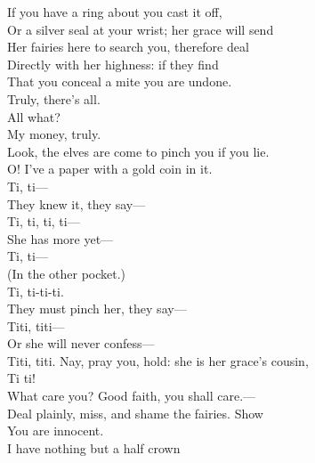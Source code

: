 \documentclass[a4paper,oneside,12pt]{memoir}
\begin{document}
\begin{drama*}
If you have a ring about you cast it off,\\
Or a silver seal at your wrist; her grace will send\\
Her fairies here to search you, therefore deal\\
Directly with her highness: if they find\\
That you conceal a mite you are undone.\\
\dapperspeaks Truly, there's all.\\
\facespeaks {} All what?\\
\dapperspeaks {} My money, truly.\\
\facespeaks Look, the elves are come to pinch you if you lie.\\
\dapperspeaks O! I've a paper with a gold coin in it.\\
\dolspeaks Ti, ti---\\
\facespeaks {} They knew it, they say---\\
\dolspeaks {} Ti, ti, ti, ti---\\
\subtlespeaks {} She has more yet---\\
\dolspeaks Ti, ti---\\
\facespeaks {} (In the other pocket.)\\
\dolspeaks {} Ti, ti-ti-ti.\\
\subtlespeaks They must pinch her, they say---\\
\dolspeaks {} Titi, titi---\\
\subtlespeaks Or she will never confess---\\
\dolspeaks {} Titi, titi.
\facespeaks Nay, pray you, hold: she is her grace's cousin,\\
\dolspeaks Ti ti!\\
\facespeaks {} What care you? Good faith, you shall care.---\\
Deal plainly, miss, and shame the fairies. Show\\
You are innocent.\\
\dapperspeaks {} I have nothing but a half crown\\

\end{drama*}
\end{document}
